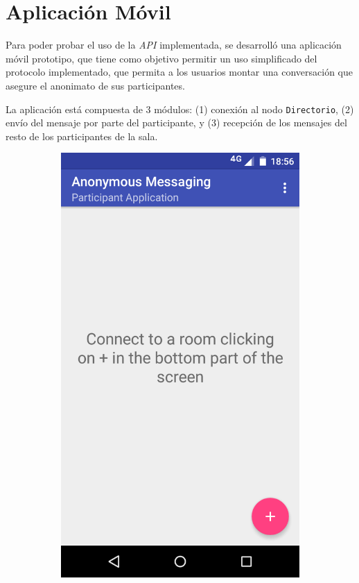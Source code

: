 {\section{Aplicación Móvil}

Para poder probar el uso de la \emph{API} implementada, se desarrolló una 
aplicación móvil prototipo, que tiene como objetivo permitir un uso 
simplificado 
del protocolo implementado, que permita a los usuarios montar una conversación 
que asegure el anonimato de sus participantes.

La aplicación está compuesta de 3 módulos: (1) conexión al nodo 
\texttt{Directorio}, (2) envío del mensaje por parte del participante, y (3) recepción de los mensajes del resto de los participantes de la sala.

\begin{figure}[H]
    \centering
    \begin{subfigure}[b]{0.4\textwidth}
        \includegraphics[width=\textwidth]{imagenes/mobile_first.png}

\end{subfigure}
\end{figure}}
